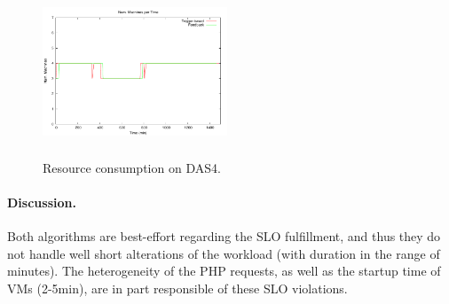 \begin{figure}
\begin{center}
\includegraphics[width=0.49\textwidth, height=5cm]{./images/homogeneous/numMachinesComp}
\end{center}
\vspace{-5mm}
\caption{Resource consumption on DAS4.}
\label{resComDas4}
\end{figure}

\paragraph{Discussion.}




Both algorithms are best-effort regarding the SLO fulfillment, and thus they do not handle well short alterations of the workload (with duration in the range of minutes). The heterogeneity of the PHP requests, as well as the startup time of VMs (2-5min), are in part responsible of these SLO violations.

